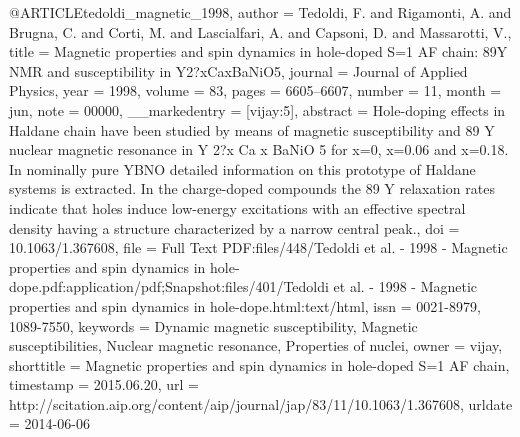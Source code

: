 @ARTICLE{tedoldi_magnetic_1998,
  author = {Tedoldi, F. and Rigamonti, A. and Brugna, C. and Corti, M. and Lascialfari,
	A. and Capsoni, D. and Massarotti, V.},
  title = {Magnetic properties and spin dynamics in hole-doped {S}=1 {AF} chain:
	89Y {NMR} and susceptibility in {Y}2?{xCaxBaNiO}5},
  journal = {Journal of Applied Physics},
  year = {1998},
  volume = {83},
  pages = {6605--6607},
  number = {11},
  month = jun,
  note = {00000},
  __markedentry = {[vijay:5]},
  abstract = {Hole-doping effects in Haldane chain have been studied by means of
	magnetic susceptibility and 89 Y nuclear magnetic resonance in Y
	2?x Ca x BaNiO 5 for x=0, x=0.06 and x=0.18. In nominally pure YBNO
	detailed information on this prototype of Haldane systems is extracted.
	In the charge-doped compounds the 89 Y relaxation rates indicate
	that holes induce low-energy excitations with an effective spectral
	density having a structure characterized by a narrow central peak.},
  doi = {10.1063/1.367608},
  file = {Full Text PDF:files/448/Tedoldi et al. - 1998 - Magnetic properties and spin dynamics in hole-dope.pdf:application/pdf;Snapshot:files/401/Tedoldi et al. - 1998 - Magnetic properties and spin dynamics in hole-dope.html:text/html},
  issn = {0021-8979, 1089-7550},
  keywords = {Dynamic magnetic susceptibility, Magnetic susceptibilities, Nuclear
	magnetic resonance, Properties of nuclei},
  owner = {vijay},
  shorttitle = {Magnetic properties and spin dynamics in hole-doped {S}=1 {AF} chain},
  timestamp = {2015.06.20},
  url = {http://scitation.aip.org/content/aip/journal/jap/83/11/10.1063/1.367608},
  urldate = {2014-06-06}
}


